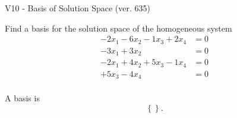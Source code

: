 \begin{exercise}
  \begin{exerciseTitle}V10 - Basis of Solution Space (ver. 635)\end{exerciseTitle}
  \begin{exerciseStatement}
    Find a basis for the solution space of the homogeneous system 
\begin{align*}
 -2 x_ 1 -6 x_ 2 -1 x_ 3 + 2 x_ 4 &= 0  \\ 
  -3 x_ 1 + 3 x_ 2 &= 0  \\ 
  -2 x_ 1 + 4 x_ 2 + 5 x_ 3 -1 x_ 4 &= 0  \\ 
  + 5 x_ 3 -4 x_ 4 &= 0  \\ 
 \end{align*}


 
  \end{exerciseStatement}

  \begin{exerciseAnswer}
   A basis is   
\[\left\{\right\}.\]

  


  \end{exerciseAnswer}
\end{exercise}